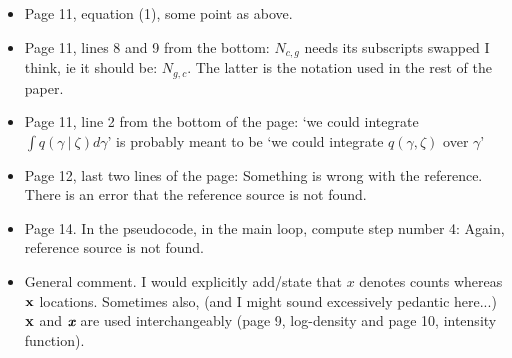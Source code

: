 \documentclass[12pt]{article}
\newcommand\givenbase[1][]{\:#1\lvert\:}
\let\given\givenbase
\begin{document}
\begin{itemize}
     \item Page 11, equation (1), some point as above.

     \item Page 11,  lines 8 and 9 from the bottom: $N_{c,g}$ needs its subscripts swapped I think, ie it should be: $N_{g,c}$.  The latter is the notation used in the rest of the paper.

    \item Page 11, line 2 from the bottom of the page: `we could integrate $\int q(\gamma \given \zeta) d\gamma$' is probably meant to be `we could integrate $q(\gamma, \zeta)$ over $\gamma$'

    \item Page 12, last two lines of the page: Something is wrong with the reference. There is an error that the reference source is not found.

   \item Page 14. In the pseudocode, in the main loop, compute step number 4: Again, reference source is not found. 

   \item General comment. I would explicitly add/state that $x$ denotes counts whereas ${\bf x}$ locations. Sometimes also, (and I might sound excessively pedantic here...) ${\bf x}$ and  $\textit{\textbf{x}}$ are used interchangeably (page 9, log-density and page 10, intensity function).
\end{itemize}
\end{document}
